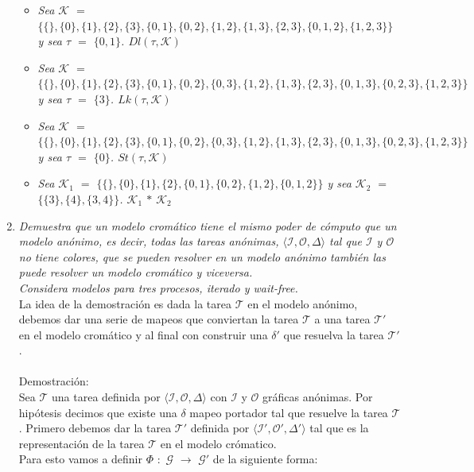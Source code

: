 \documentclass{article}
\begin{document}
\begin{enumerate}
{    \begin{itemize}
    \item{
        \textsl{
        Sea $\mathcal{K}$ $=$ $\{\{\}, \{0\}, \{1\}, \{2\}, \{3\},
        \{0,1\}, \{0,2\}, \{1,2\}, \{1,3\}, \{2,3\}, \{0,1,2\},
        \{1,2,3\} \}$ y sea $\tau$ $=$ $\{0,1\}$. $Dl(\tau,\mathcal{K})$
      }
      }
      
    \item{
        \textsl{
        Sea $\mathcal{K}$ $=$ $\{\{\}, \{0\}, \{1\}, \{2\}, \{3\},
        \{0,1\}, \{0,2\}, \{0,3\}, \{1,2\}, \{1,3\}, \{2,3\}, \{0,1,3\},
        \{0,2,3\}, \{1,2,3\}\}$ y sea $\tau$ $=$ $\{3\}$. $Lk(\tau,\mathcal{K})$
      }
    }

    \item{
        \textsl{
          Sea $\mathcal{K}$ $=$ $\{ \{ \}, \{0\} , \{1\}, \{2\}, \{3\}, \{0, 1\},\{0,
              2\}, \{0, 3\},\{1, 2\}, \{1, 3\}, \{2, 3\},
              \{0,1,3\},\{0,2,3\},\{1,2,3\}\}$ y sea $\tau$ $=$ $\{0\}$. $St(\tau,\mathcal{K})$
        }
      }

    \item{
        \textsl{
          Sea $\mathcal{K}_1$ $=$
          $\{\{\},\{0\},\{1\},\{2\},\{0,1\},\{0,2\},\{1,2\},\{0,1,2\}\}$
          y sea $\mathcal{K}_2$ $=$ $\{\{3\}, \{4\}, \{3,
          4\}\}$. $\mathcal{K}_1$ $*$ $\mathcal{K}_2$
        }
      }
    \end{itemize}
  }

  \item{
      \textsl{
        Demuestra que un modelo cromático tiene el mismo poder de
        cómputo que un modelo anónimo, es decir, todas las tareas
        anónimas, $\langle\mathcal{I},\mathcal{O},\Delta\rangle$ tal
        que $\mathcal{I}$ y $\mathcal{O}$ no tiene colores, que se
        pueden resolver en un modelo anónimo también las puede
        resolver un modelo cromático y viceversa.\\
        Considera modelos para tres procesos, iterado y wait-free.\\
      }
      La idea de la demostración es dada la tarea $\mathcal{T}$ en el
      modelo anónimo, debemos dar una serie de mapeos que conviertan
      la tarea $\mathcal{T}$ a una tarea $\mathcal{T}'$ en el modelo
      cromático y al final con construir una $\delta'$ que resuelva la
      tarea $\mathcal{T}'$.\\
      \\
      Demostración:\\
      Sea $\mathcal{T}$ una tarea definida por
      $\langle\mathcal{I},\mathcal{O},\Delta\rangle$ con $\mathcal{I}$
      y $\mathcal{O}$ gráficas anónimas. Por hipótesis decimos que
      existe una $\delta$ mapeo portador tal que resuelve la tarea
      $\mathcal{T}$. Primero debemos dar la tarea $\mathcal{T}'$
      definida por $\langle\mathcal{I}',\mathcal{O}',\Delta'\rangle$
      tal que es la representación de la tarea $\mathcal{T}$ en el
      modelo crómatico. \\
      Para esto vamos a definir $\Phi$ $:$ $\mathcal{G}$
      $\xrightarrow{}$ $\mathcal{G}'$ de la siguiente forma:\\

}
\end{enumerate}
\end{document}
